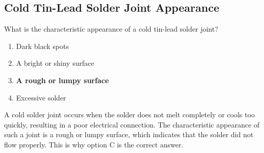 \subsection{Cold Tin-Lead Solder Joint Appearance}
\label{T7D09}

\begin{tcolorbox}[colback=gray!10!white,colframe=black!75!black,title=T7D09]
What is the characteristic appearance of a cold tin-lead solder joint?
\begin{enumerate}[noitemsep]
    \item Dark black spots
    \item A bright or shiny surface
    \item \textbf{A rough or lumpy surface}
    \item Excessive solder
\end{enumerate}
\end{tcolorbox}

A cold solder joint occurs when the solder does not melt completely or cools too quickly, resulting in a poor electrical connection. The characteristic appearance of such a joint is a rough or lumpy surface, which indicates that the solder did not flow properly. This is why option C is the correct answer.